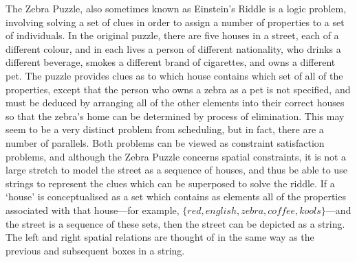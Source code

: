 \documentclass[a4paper,12pt,leqno,twoside]{article}
\begin{document}
The Zebra Puzzle, also sometimes known as Einstein's Riddle is a logic problem, involving solving a set of clues in order to assign a number of properties to a set of individuals. In the original puzzle, there are five houses in a street, each of a different colour, and in each lives a person of different nationality, who drinks a different beverage, smokes a different brand of cigarettes, and owns a different pet. The puzzle provides clues as to which house contains which set of all of the properties, except that the person who owns a zebra as a pet is not specified, and must be deduced by arranging all of the other elements into their correct houses so that the zebra's home can be determined by process of elimination. This may seem to be a very distinct problem from scheduling, but in fact, there are a number of parallels. Both problems can be viewed as constraint satisfaction problems, and although the Zebra Puzzle concerns spatial constraints, it is not a large stretch to model the street as a sequence of houses, and thus be able to use strings to represent the clues which can be superposed to solve the riddle. If a `house' is conceptualised as a set which contains as elements all of the properties associated with that house---for example, $\{red, english, zebra, coffee, kools\}$---and the street is a sequence of these sets, then the street can be depicted as a string. The left and right spatial relations are thought of in the same way as the previous and subsequent boxes in a string.
\end{document}
